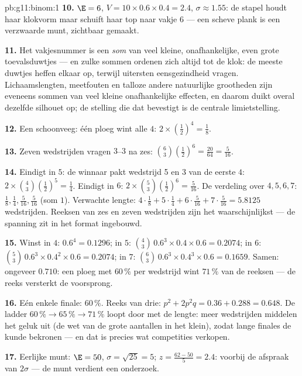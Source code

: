 \begin{solution}{pb:g11:binom:1}
\textbf{10.} $\E = 6$, $V = 10 \times 0.6 \times 0.4 = 2.4$,
$\sigma \approx 1.55$: de stapel houdt haar klokvorm maar schuift haar top
naar vakje $6$ --- een scheve plank is een verzwaarde munt, zichtbaar
gemaakt.

\textbf{11.} Het vakjesnummer is een \emph{som} van veel kleine,
onafhankelijke, even grote toevalsduwtjes --- en zulke sommen ordenen zich
altijd tot de klok: de meeste duwtjes heffen elkaar op, terwijl uitersten
eensgezindheid vragen. Lichaamslengten, meetfouten en talloze andere
natuurlijke grootheden zijn eveneens sommen van veel kleine onafhankelijke
effecten, en daarom duikt overal dezelfde silhouet op; de stelling die dat
bevestigt is de centrale limietstelling.

\textbf{12.} Een schoonveeg: één ploeg wint alle $4$:
$2 \times \left(\frac12\right)^4 = \frac18$.

\textbf{13.} Zeven wedstrijden vragen $3$--$3$ na zes:
$\binom63 \left(\frac12\right)^6 = \frac{20}{64} = \frac{5}{16}$.

\textbf{14.} Eindigt in $5$: de winnaar pakt wedstrijd 5 en $3$ van de eerste
$4$: $2 \times \binom43 \left(\frac12\right)^5 = \frac14$. Eindigt in $6$:
$2 \times \binom53 \left(\frac12\right)^6 = \frac{5}{16}$. De verdeling over
$4, 5, 6, 7$: $\frac18, \frac14, \frac{5}{16}, \frac{5}{16}$ (som $1$).
Verwachte lengte: $4 \cdot \frac18 + 5 \cdot \frac14 + 6 \cdot \frac{5}{16} +
7 \cdot \frac{5}{16} = 5.8125$ wedstrijden. Reeksen van zes en zeven
wedstrijden zijn het waarschijnlijkst --- de spanning zit in het format
ingebouwd.

\textbf{15.} Winst in $4$: $0.6^4 = 0.1296$; in $5$:
$\binom43\,0.6^3 \times 0.4 \times 0.6 = 0.2074$; in $6$:
$\binom53\,0.6^3 \times 0.4^2 \times 0.6 = 0.2074$; in $7$:
$\binom63\,0.6^3 \times 0.4^3 \times 0.6 = 0.1659$. Samen: ongeveer $0.710$:
een ploeg met $60\,\%$ per wedstrijd wint $71\,\%$ van de reeksen --- de
reeks versterkt de voorsprong.

\textbf{16.} Eén enkele finale: $60\,\%$. Reeks van drie:
$p^2 + 2p^2 q = 0.36 + 0.288 = 0.648$. De ladder
$60\,\% \to 65\,\% \to 71\,\%$ loopt door met de lengte: meer wedstrijden
middelen het geluk uit (de wet van de grote aantallen in het klein), zodat
lange finales de kunde bekronen --- en dat is precies wat competities
verkopen.

\textbf{17.} Eerlijke munt: $\E = 50$, $\sigma = \sqrt{25} = 5$;
$z = \frac{62 - 50}{5} = 2.4$: voorbij de afspraak van $2\sigma$ --- de munt
verdient een onderzoek.


\end{solution}
